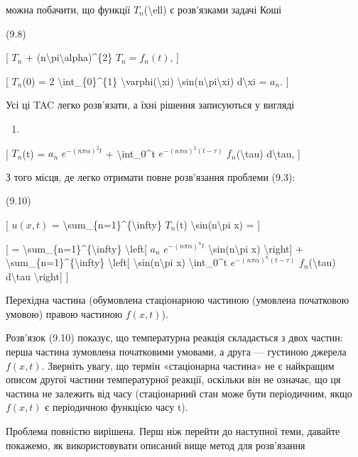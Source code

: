 \documentclass[
]{article}
\providecommand{\tightlist}{%
  \setlength{\itemsep}{0pt}\setlength{\parskip}{0pt}}
\begin{document}
{{можна побачити, що функції \(T_n\)(\textbackslash ell) є розв'язками
задачі Коші

(9.8)

{[} \(T_{n}\) + (n\textbackslash pi\textbackslash alpha)\^{}\{2\}
\(T_{n} = f_{n}(t)\), {]}

{[} \(T_{n}\)(0) = 2 \textbackslash int\_\{0\}\^{}\{1\}
\textbackslash varphi(\textbackslash xi)
\textbackslash sin(n\textbackslash pi\textbackslash xi)
d\textbackslash xi = \(a_{n}\). {]}

Усі ці TAC легко розв'язати, а їхні рішення записуються у вигляді

\begin{enumerate}
\def\labelenumi{(\arabic{enumi})}
\setcounter{enumi}{98}
\tightlist
\item
\end{enumerate}

{[} \(T_n\)(t) = \(a_n\) \(e^{-(n\pi\alpha)^2 t}\) +
\textbackslash int\_0\^{}t \(e^{-(n\pi\alpha)^2 (t-\tau)}\)
\(f_n\)(\textbackslash tau) d\textbackslash tau, {]}

З того місця, де легко отримати повне розв'язання проблеми (9.3):

(9.10)

{[} \(u(x, t)\) =
\textbackslash sum\_\{n=1\}\^{}\{\textbackslash infty\} \(T_n\)(t)
\textbackslash sin(n\textbackslash pi x) = {]}

{[} = \textbackslash sum\_\{n=1\}\^{}\{\textbackslash infty\}
\textbackslash left{[} \(a_n\) \(e^{-(n\pi\alpha)^n t}\)
\textbackslash sin(n\textbackslash pi x) \textbackslash right{]} +
\textbackslash sum\_\{n=1\}\^{}\{\textbackslash infty\}
\textbackslash left{[} \textbackslash sin(n\textbackslash pi x)
\textbackslash int\_0\^{}t \(e^{-(n\pi\alpha)^n (t-\tau)}\)
\(f_n\)(\textbackslash tau) d\textbackslash tau \textbackslash right{]}
{]}

Перехідна частина (обумовлена стаціонарною частиною (умовлена початковою
умовою) правою частиною \(f(x, t)\)).

Розв'язок (9.10) показує, що температурна реакція складається з двох
частин: перша частина зумовлена початковими умовами, а друга ---
густиною джерела \(f(x,t)\). Зверніть увагу, що термін «стаціонарна
частина» не є найкращим описом другої частини температурної реакції,
оскільки він не означає, що ця частина не залежить від часу
(стаціонарний стан може бути періодичним, якщо \(f(x, t)\) є періодичною
функцією часу t).

Проблема повністю вирішена. Перш ніж перейти до наступної теми, давайте
покажемо, як використовувати описаний вище метод для розв'язання

}}
\end{document}
